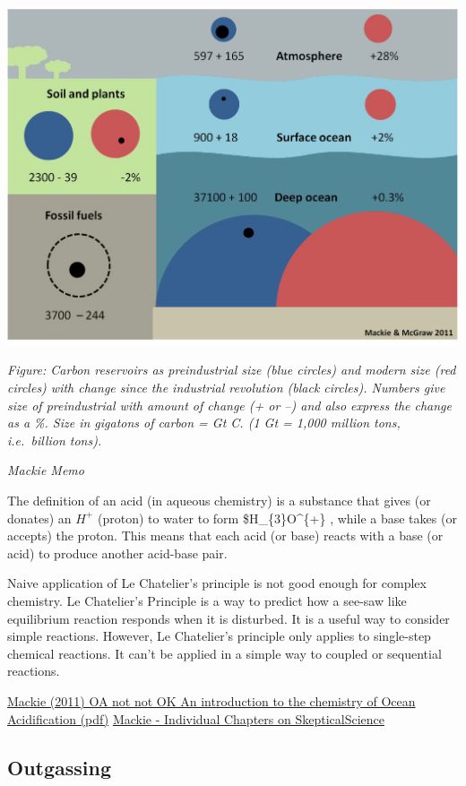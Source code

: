 \documentclass[
]{book}
\begin{document}
\includegraphics{fig/carbon_reservoirs.png}

\emph{Figure: Carbon reservoirs as preindustrial size (blue circles) and modern size (red circles) with
change since the industrial revolution (black circles). Numbers give size of preindustrial with
amount of change (+ or --) and also express the change as a \%. Size in gigatons of carbon = Gt
C. (1 Gt = 1,000 million tons, i.e.~billion tons).}

\emph{Mackie Memo}

The definition of an acid (in aqueous chemistry) is a substance that
gives (or donates) an \(H^{+}\) (proton) to water to form \$H\_\{3\}O\^{}\{+\} ,
while a base takes (or accepts) the proton.
This means that each acid (or base) reacts with a base (or acid) to produce another
acid-base pair.

Naive application of Le Chatelier's principle is not good enough for complex chemistry.
Le Chatelier's Principle is a way to predict how a see-saw
like equilibrium reaction responds when it is disturbed. It is a useful way to consider simple
reactions. However, Le Chatelier's principle only applies to single-step chemical reactions. It
can't be applied in a simple way to coupled or sequential reactions.

\href{pdf/Mackie_2011_Ocean_Acidification_Intro.pdf}{Mackie (2011) OA not not OK An introduction to the chemistry of Ocean Acidification (pdf)}
\href{https://skepticalscience.com/Mackie_OA_not_OK_post_0.html}{Mackie - Individual Chapters on SkepticalScience}

\hypertarget{outgassing}{%
\subsection{Outgassing}\label{outgassing}}
\end{document}
